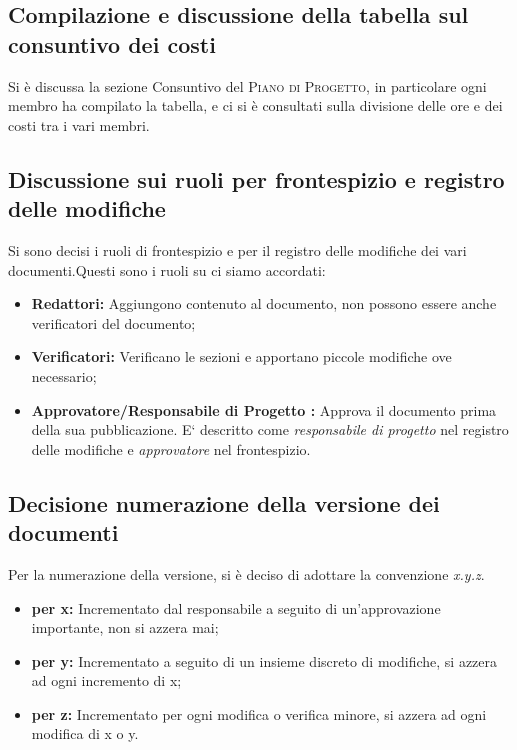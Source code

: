 \subsection{Compilazione e discussione della tabella sul consuntivo dei costi}
Si è discussa la sezione Consuntivo del \textsc{Piano di Progetto}, in particolare ogni membro ha compilato la tabella, e ci si è consultati sulla divisione delle ore e dei costi tra i vari membri.

\subsection{Discussione sui ruoli per frontespizio e registro delle modifiche}
Si sono decisi i ruoli di frontespizio e per il registro delle modifiche dei vari documenti.\newline Questi sono i ruoli su ci siamo accordati:
\begin{itemize}
	\item \textbf{Redattori:} Aggiungono contenuto al documento, non possono essere anche verificatori del documento;
	\item \textbf{Verificatori:} Verificano le sezioni e apportano piccole modifiche ove necessario;
	\item \textbf{Approvatore/Responsabile di Progetto :} Approva il documento prima della sua pubblicazione. E` descritto come \textit{responsabile di progetto} nel registro delle modifiche e \textit{approvatore} nel frontespizio.
\end{itemize}

\subsection{Decisione numerazione della versione dei documenti}
Per la numerazione della versione, si è deciso di adottare la convenzione \textit{x.y.z}.\\
\begin{itemize}
	\item \textbf{{per x:}} Incrementato dal responsabile a seguito di un’approvazione importante, non si azzera mai;
	\item \textbf{{per y:}} Incrementato a seguito di un insieme discreto di modifiche, si azzera ad ogni incremento di x;
	\item \textbf{{per z:}} Incrementato per ogni modifica o verifica minore, si azzera ad ogni modifica di x o y.
\end{itemize}
